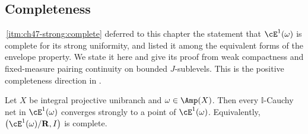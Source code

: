 \subsection{Completeness}
\label{sec:ch48-completeness}

\,\cref{itm:ch47-strong:complete} deferred to
this chapter the statement that $\cE^1(\omega)$ is complete for its strong
uniformity, and  listed it among
the equivalent forms of the envelope property.  We state it here and
give its proof from weak compactness and fixed-measure pairing
continuity on bounded $J$-sublevels. This is the positive completeness
direction in \cite[Theorem~12.8]{BJ22}.

\begin{theorem}
\label{thm:ch48-completeness}
Let $X$ be integral projective unibranch and $\omega\in\Amp(X)$.  Then
every $\mathbb I$-Cauchy net in $\cE^1(\omega)$ converges strongly to a
point of $\cE^1(\omega)$.  Equivalently,
$\bigl(\cE^1(\omega)/\mathbf R,I\bigr)$ is complete.
\end{theorem}


